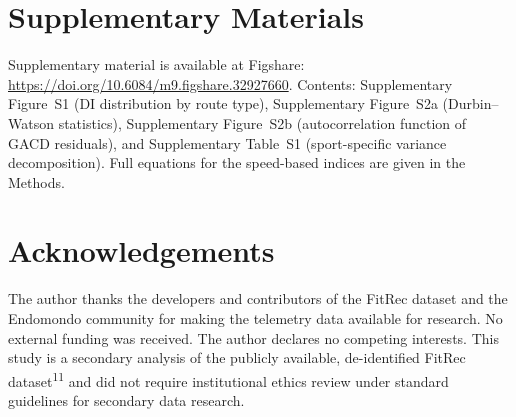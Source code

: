 \documentclass[12pt]{article}
\begin{document}
\section*{Supplementary Materials}
Supplementary material is available at Figshare:
\url{https://doi.org/10.6084/m9.figshare.32927660}. Contents:
Supplementary Figure~S1 (DI distribution by route type), Supplementary
Figure~S2a (Durbin--Watson statistics), Supplementary Figure~S2b
(autocorrelation function of GACD residuals), and Supplementary Table~S1
(sport-specific variance decomposition). Full equations for the
speed-based indices are given in the Methods.

\section*{Acknowledgements}
The author thanks the developers and contributors of the FitRec dataset
and the Endomondo community for making the telemetry data available for
research. No external funding was received. The author declares no
competing interests. This study is a secondary analysis of the publicly
available, de-identified FitRec dataset\textsuperscript{11} and did not
require institutional ethics review under standard guidelines for
secondary data research.

\end{document}
